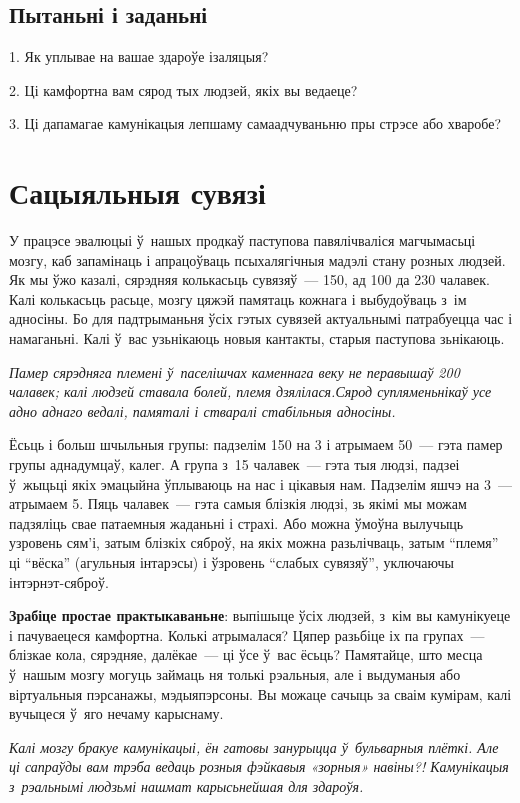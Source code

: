 \subsection*{Пытаньні і заданьні}

1. Як уплывае на вашае здароўе ізаляцыя?

2. Ці камфортна вам сярод тых людзей, якіх вы ведаеце?

3. Ці дапамагае камунікацыя лепшаму самаадчуваньню пры стрэсе або хваробе?


\section{Сацыяльныя сувязі}

У працэсе эвалюцыі ў~нашых продкаў паступова павялічваліся магчымасьці мозгу, каб запамінаць і апрацоўваць псыхалягічныя мадэлі стану розных людзей. Як мы ўжо казалі, сярэдняя колькасьць сувязяў~--- 150, ад 100 да 230 чалавек. Калі колькасьць расьце, мозгу цяжэй памятаць кожнага і выбудоўваць з~ім адносіны. Бо для падтрыманьня ўсіх гэтых сувязей актуальнымі патрабуецца час і намаганьні. Калі ў~вас узьнікаюць новыя кантакты, старыя паступова зьнікаюць.

\emph{Памер сярэдняга племені ў~паселішчах каменнага веку не перавышаў 200 чалавек; калі людзей ставала болей, племя дзялілася.Сярод супляменьнікаў усе адно аднаго ведалі, памяталі і стваралі стабільныя адносіны.}

Ёсьць і больш шчыльныя групы: падзелім 150 на 3 і атрымаем 50~--- гэта памер групы аднадумцаў, калег. А група з~15 чалавек~--- гэта тыя людзі, падзеі ў~жыцьці якіх эмацыйна ўплываюць на нас і цікавыя нам. Падзелім яшчэ на 3~--- атрымаем 5. Пяць чалавек~--- гэта самыя блізкія людзі, зь якімі мы можам падзяліць свае патаемныя жаданьні і страхі. Або можна ўмоўна вылучыць узровень сям'і, затым блізкіх сяброў, на якіх можна разьлічваць, затым ``племя'' ці ``вёска'' (агульныя інтарэсы) і ўзровень ``слабых сувязяў'', уключаючы інтэрнэт-сяброў.

\textbf{Зрабіце простае практыкаваньне}: выпішыце ўсіх людзей, з~кім вы камунікуеце і пачуваецеся камфортна. Колькі атрымалася? Цяпер разьбіце іх па групах~--- блізкае кола, сярэдняе, далёкае~--- ці ўсе ў~вас ёсьць? Памятайце, што месца ў~нашым мозгу могуць займаць ня толькі рэальныя, але і выдуманыя або віртуальныя пэрсанажы, мэдыяпэрсоны. Вы можаце сачыць за сваім кумірам, калі вучыцеся ў~яго нечаму карыснаму.

\emph{Калі мозгу бракуе камунікацыі, ён гатовы занурыцца ў~бульварныя плёткі. Але ці сапраўды вам трэба ведаць розныя фэйкавыя «зорныя» навіны?! Камунікацыя з~рэальнымі людзьмі нашмат карысьнейшая для здароўя.}

